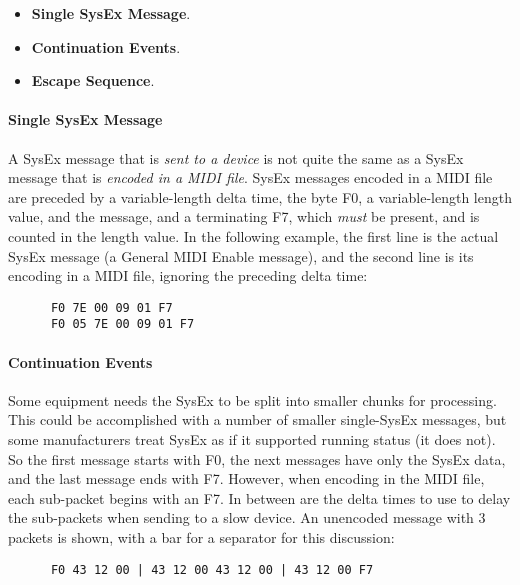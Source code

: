    \begin{itemize}
      \item \textbf{Single SysEx Message}.
      \item \textbf{Continuation Events}.
      \item \textbf{Escape Sequence}.
   \end{itemize}

\paragraph{Single SysEx Message}
\label{paragraph:patterns_single_sysex_message}

   A SysEx message that is \textsl{sent to a device} is not quite the 
   same as a SysEx message that is \textsl{encoded in a MIDI file}.
   SysEx messages encoded in a MIDI file
   are preceded by a variable-length delta time, the byte F0,
   a variable-length length value, and the message, and a terminating F7,
   which \textsl{must} be present, and is counted in the length value.
   In the following example, the first line is the actual SysEx message
   (a General MIDI Enable message),
   and the second line is its encoding in a MIDI file, ignoring the preceding
   delta time:

   \begin{verbatim}
      F0 7E 00 09 01 F7
      F0 05 7E 00 09 01 F7
   \end{verbatim}

\paragraph{Continuation Events}
\label{paragraph:patterns_continuation_events}

   Some equipment needs the SysEx to be split into smaller chunks for
   processing.
   This could be accomplished with a number of smaller single-SysEx messages,
   but some manufacturers treat SysEx as if it supported running status (it
   does not).
   So the first message starts with F0, the next messages have only the SysEx
   data, and the last message ends with F7.
   However, when encoding in the MIDI file, each sub-packet begins with
   an F7.
   In between are the delta times to use to delay the sub-packets when sending
   to a slow device.
   An unencoded message with 3 packets is shown,
   with a bar for a separator for this discussion:

   \begin{verbatim}
      F0 43 12 00 | 43 12 00 43 12 00 | 43 12 00 F7
   \end{verbatim}

